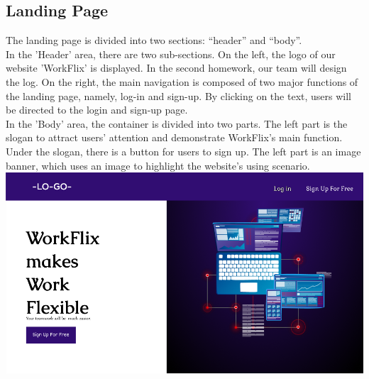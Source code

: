 \subsection{Landing Page}
The landing page is divided into two sections: “header” and “body”. \\
In the 'Header' area, there are two sub-sections. On the left, the logo of our 
website 'WorkFlix' is displayed. In the second homework, our team will design the log.
On the right, the main navigation is composed of two major functions of the landing page, namely, log-in and sign-up.
By clicking on the text, users will be directed to the login and sign-up page.\\
In the 'Body' area, the container is divided into two parts. 
The left part is the slogan to attract users' attention and demonstrate WorkFlix's main function.
Under the slogan, there is a button for users to sign up. 
The left part is an image banner, which uses an image to highlight the website's using scenario. \\


\includegraphics[width=\columnwidth]{images/LandingPage.png}